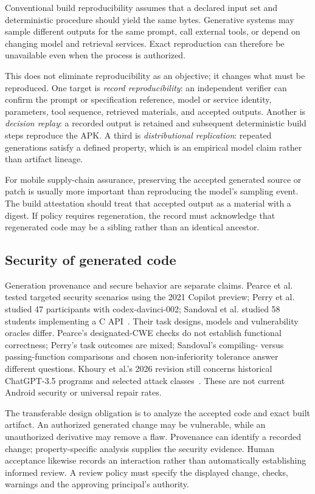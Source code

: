 Conventional build reproducibility assumes that a declared input set and deterministic procedure should yield the same bytes. Generative systems may sample different outputs for the same prompt, call external tools, or depend on changing model and retrieval services. Exact reproduction can therefore be unavailable even when the process is authorized.

This does not eliminate reproducibility as an objective; it changes what must be reproduced. One target is \emph{record reproducibility}: an independent verifier can confirm the prompt or specification reference, model or service identity, parameters, tool sequence, retrieved materials, and accepted outputs. Another is \emph{decision replay}: a recorded output is retained and subsequent deterministic build steps reproduce the APK. A third is \emph{distributional replication}: repeated generations satisfy a defined property, which is an empirical model claim rather than artifact lineage.

For mobile supply-chain assurance, preserving the accepted generated source or patch is usually more important than reproducing the model's sampling event. The build attestation should treat that accepted output as a material with a digest. If policy requires regeneration, the record must acknowledge that regenerated code may be a sibling rather than an identical ancestor.

\subsection{Security of generated code}

Generation provenance and secure behavior are separate claims. Pearce et al. tested targeted security scenarios using the 2021 Copilot preview; Perry et al. studied 47 participants with codex-davinci-002; Sandoval et al. studied 58 students implementing a C API~\cite{pearce,perry,sandoval}. Their task designs, models and vulnerability oracles differ. Pearce's designated-CWE checks do not establish functional correctness; Perry's task outcomes are mixed; Sandoval's compiling- versus passing-function comparisons and chosen non-inferiority tolerance answer different questions. Khoury et al.'s 2026 revision still concerns historical ChatGPT-3.5 programs and selected attack classes~\cite{khoury}. These are not current Android security or universal repair rates.

The transferable design obligation is to analyze the accepted code and exact built artifact. An authorized generated change may be vulnerable, while an unauthorized derivative may remove a flaw. Provenance can identify a recorded change; property-specific analysis supplies the security evidence. Human acceptance likewise records an interaction rather than automatically establishing informed review. A review policy must specify the displayed change, checks, warnings and the approving principal's authority.

